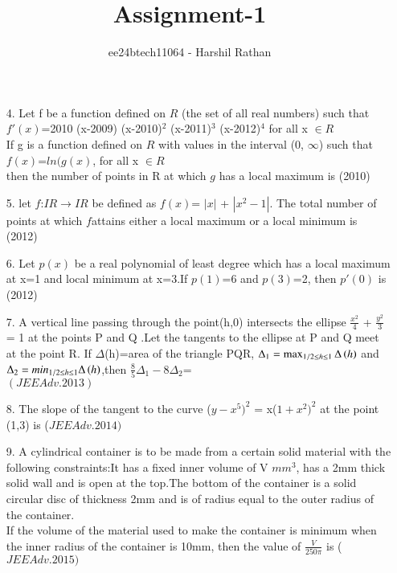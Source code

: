 \documentclass[journal,12pt,twocolumn]{IEEEtran}
\theoremstyle{remark}
\begin{document}

\vspace{3cm}

\title{Assignment-1}
\author{ee24btech11064 - Harshil Rathan}
\maketitle
\newpage
\bigskip

\renewcommand{\thefigure}{\theenumi}
\renewcommand{\thetable}{\theenumi}
\begin{enumerate}
\item[4.] Let f be a function defined on $R$ (the set of all real numbers) such that $f'(x)$=2010 (x-2009) (x-2010)$^2$ (x-2011)$^3$ (x-2012)$^4$ for all x $\in R$ \\ If g is a function defined on $R$ with values in the interval (0, $\infty$) such that \\

\hspace{1cm}  $f(x)$=$ln (g(x)$, for all x $\in R$\\ then the number of points in R at which $g$ has a local maximum is \hfill (2010)\\
\item[5.] let $f$:$IR \rightarrow IR$ be defined as $f(x)$= $|x|$ + $|x^2-1|$. The total number of points at which $f$attains either a local maximum or a local minimum is\\ \hfill (2012) \\
\item[6.]Let $p(x)$ be a real polynomial of least degree which has a local maximum at x=1 and local minimum at x=3.If $p(1)$=6 and $p(3)$=2, then $p'(0)$ is \hfill (2012) \\
\item[7.]A vertical line passing through the point(h,0) intersects the ellipse $\frac{x^2}{4}$ + $\frac{y^2}{3}$ = 1 at the points P and Q .Let the tangents to the ellipse at P and Q meet at the point R. If $\Delta$(h)=area of the triangle PQR, $\Delta_1  = \max _{1/2\leq h \leq 1}\Delta\left(h\right)$ and $\Delta_2 = min_{1/2\leq h \leq 1}\Delta\left(h\right)$,then $\frac{8}{5}\Delta_1 - 8\Delta_2$=\\\hfill $(JEEAdv.2013)$\\
\item[8.]The slope of the tangent to the curve ($y-x^5)^2$ = x($1+x^2)^2$ at the point (1,3) is \hfill ($JEE Adv. 2014)$ \\
\item[9.]A cylindrical container is to be made from a certain solid material with the following constraints:It has a fixed inner volume of V $mm^3$, has a 2mm thick solid wall and is open at the top.The bottom of the container is a solid circular disc of thickness 2mm and is of radius equal to the outer radius of the container.\\If the volume of the material used to make the container is minimum when the inner radius of the container is 10mm, then the value of $\frac{V}{250\pi}$ is \hfill ($JEE Adv. 2015)$ \\  
\end{enumerate}
\end{document}
